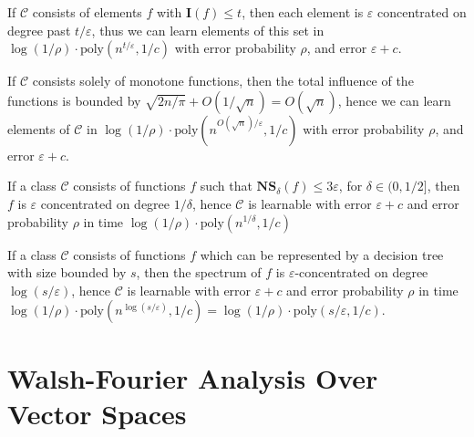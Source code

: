 \begin{example}
    If $\mathcal{C}$ consists of elements $f$ with $\mathbf{I}(f) \leq t$, then each element is $\varepsilon$ concentrated on degree past $t/\varepsilon$, thus we can learn elements of this set in $\log(1/\rho) \cdot \text{poly}(n^{t/\varepsilon}, 1/c)$ with error probability $\rho$, and error $\varepsilon + c$.
\end{example}

\begin{example}
    If $\mathcal{C}$ consists solely of monotone functions, then the total influence of the functions is bounded by $\sqrt{2n/\pi} + O(1/\sqrt{n}) = O(\sqrt{n})$, hence we can learn elements of $\mathcal{C}$ in $\log(1/\rho) \cdot \text{poly}(n^{O(\sqrt{n})/\varepsilon},1/c)$ with error probability $\rho$, and error $\varepsilon + c$.
\end{example}

\begin{example}
    If a class $\mathcal{C}$ consists of functions $f$ such that $\mathbf{NS}_\delta(f) \leq 3\varepsilon$, for $\delta \in (0,1/2]$, then $f$ is $\varepsilon$ concentrated on degree $1/\delta$, hence $\mathcal{C}$ is learnable with error $\varepsilon + c$ and error probability $\rho$ in time $\log(1/\rho) \cdot \text{poly}(n^{1/\delta},1/c)$
\end{example}

\begin{example}
    If a class $\mathcal{C}$ consists of functions $f$ which can be represented by a decision tree with size bounded by $s$, then the spectrum of $f$ is $\varepsilon$-concentrated on degree $\log(s/\varepsilon)$, hence $\mathcal{C}$ is learnable with error $\varepsilon + c$ and error probability $\rho$ in time $\log(1/\rho) \cdot \text{poly}(n^{\log(s/\varepsilon)}, 1/c) = \log(1/\rho) \cdot \text{poly}(s/\varepsilon, 1/c)$.
\end{example}

\section{Walsh-Fourier Analysis Over Vector Spaces}

